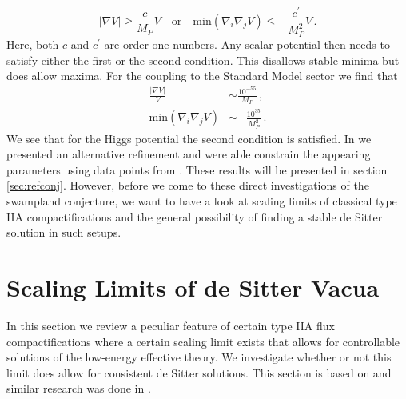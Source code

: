 \documentclass[a4paper,12pt,twoside,openright]{report}
\newcommand{\be}{\begin{equation}}
\newcommand{\ee}{\end{equation}}
\newcommand{\bea}{\begin{equation}\begin{aligned}}
\newcommand{\eea}{\end{aligned}\end{equation}}
\begin{document}
\be
|\nabla V| \geq \frac{c}{M_P} V\quad \text{or} \quad \text{min}(\nabla_i \nabla_j V) \leq - \frac{c^\prime}{M_P^2} V\,.
\label{eq:dScon}
\ee
Here, both $c$ and $c^\prime$ are order one numbers. Any scalar potential then needs to satisfy either the first or the second condition. This disallows stable minima but does allow maxima. For the coupling to the Standard Model sector we find that 
\bea 
\frac{|\nabla V|}{V} &\sim \frac{10^{-55}}{M_P}\,,\\
\text{min}(\nabla_i \nabla_j V) &\sim -\frac{10^ {35}}{M_P^ 2}\,.
\eea 
We see that for the Higgs potential the second condition is satisfied. In \cite{Andriot:2018mav} we presented an alternative refinement and were able constrain the appearing parameters using data points from \cite{Roupec:2018mbn}. These results will be presented in section \ref{sec:refconj}. However, before we come to these direct investigations of the swampland conjecture, we want to have a look at scaling limits of classical type IIA compactifications and the general possibility of finding a stable de Sitter solution in such setups.

\section{Scaling Limits of de Sitter Vacua}
\label{sec:scaling}
In this section we review a peculiar feature of certain type IIA flux compactifications where a certain scaling limit exists that allows for controllable solutions of the low-energy effective theory. We investigate whether or not this limit does allow for consistent de Sitter solutions. This section is based on \cite{Banlaki:2018ayh} and similar research was done in \cite{Junghans:2018gdb}.
\end{document}
